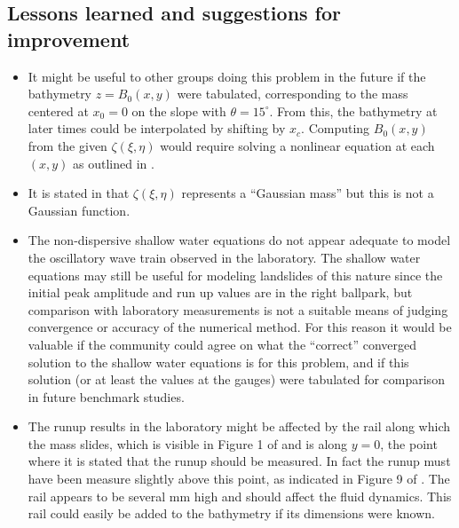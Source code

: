 

\subsection{Lessons learned and suggestions for improvement}

\begin{itemize}
\item It might be useful to other groups doing this problem in the future if
the bathymetry $z=B_0(x,y)$ were tabulated, corresponding to the mass centered
at $x_0=0$ on the slope with $\theta = 15^\circ$.  From this, the bathymetry
at later times could be interpolated by shifting by $x_c$.  Computing
$B_0(x,y)$ from the given $\zeta(\xi,\eta)$ would require solving a
nonlinear equation at each $(x,y)$ as outlined in .

\item It is stated in \cite{bp-description} that $\zeta(\xi,\eta)$
represents a ``Gaussian mass'' but this is not a Gaussian function.

\item The non-dispersive shallow water equations do not appear adequate to
model the oscillatory wave train observed in the laboratory.  The shallow
water equations may still be useful for modeling landslides of this nature
since the initial peak amplitude and run up values are in the right
ballpark, but comparison with laboratory measurements is not a suitable
means of judging convergence or accuracy of the numerical method.  For this
reason it would be valuable if the community could agree on what the
``correct'' converged
solution to the shallow water equations is for this problem, and if this
solution (or at least the values at the gauges) were tabulated for
comparison in future benchmark studies.

\item The runup results in the laboratory might be affected by the rail
along which the mass slides, which is visible in Figure 1 of
\cite{bp-description} and is along $y=0$, the point where it is stated that
the runup should be measured.  In fact the runup must have been measure
slightly above this point, as indicated in Figure 9 of
\cite{EnetGrilli}.  The rail appears to be several mm high and should affect
the fluid dynamics.  This rail could easily be added to the bathymetry if
its dimensions were known.  

\end{itemize} 
